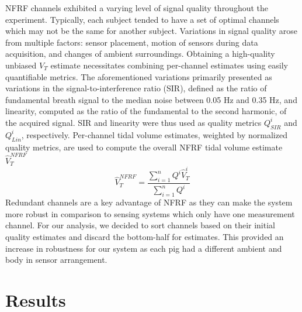 \documentclass[journal]{IEEEtran}
\begin{document}
NFRF channels exhibited a varying level of signal quality throughout the experiment. Typically, each subject tended to have a set of optimal channels which may not be the same for another subject. Variations in signal quality arose from multiple factors: sensor placement, motion of sensors during data acquisition, and changes of ambient surroundings. Obtaining a high-quality unbiased $V_T$ estimate necessitates combining per-channel estimates using easily quantifiable metrics. The aforementioned variations primarily presented as variations in the signal-to-interference ratio (SIR), defined as the ratio of fundamental breath signal to the median noise between 0.05 Hz and 0.35 Hz, and linearity, computed as the ratio of the fundamental to the second harmonic, of the acquired signal. SIR and linearity were thus used as quality metrics $Q^{i}_{SIR}$ and $Q^{i}_{Lin}$, respectively. Per-channel tidal volume estimates, weighted by normalized quality metrics, are used to compute the overall NFRF tidal volume estimate $\hat{V}^{NFRF}_{T}$ 
\begin{equation}
    \hat{V}^{NFRF}_{T} = \frac{\sum_{i=1}^{n} Q^{i} \hat{V}^{i}_{T}}{\sum_{i=1}^{n} Q^{i}}
    \label{eq:combine_channels}
\end{equation}
Redundant channels are a key advantage of NFRF as they can make the system more robust in comparison to sensing systems which only have one measurement channel. For our analysis, we decided to sort channels based on their initial quality estimates and discard the bottom-half for estimates. This provided an increase in robustness for our system as each pig had a different ambient and body in sensor arrangement. 


\section{Results}
\end{document}
